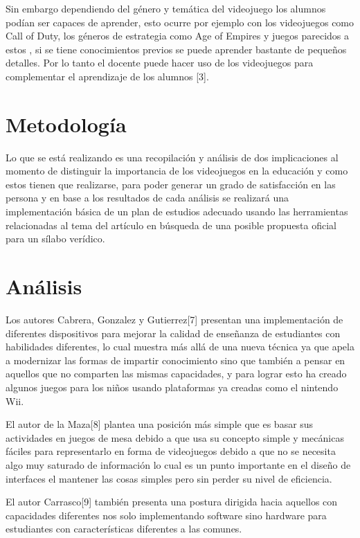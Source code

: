 \documentclass[conference, letterpaper]{IEEEtran}
\begin{document}
Sin embargo dependiendo del género y temática del videojuego los alumnos podían ser capaces de aprender, esto ocurre por ejemplo con los videojuegos como Call of Duty, los géneros de estrategia como Age of Empires y juegos parecidos a estos , si se tiene conocimientos previos se puede aprender bastante de pequeños detalles. Por lo tanto el docente puede hacer uso de los videojuegos para complementar el aprendizaje de los alumnos [3]. 
\section{Metodología}
Lo que se está realizando es una recopilación y análisis de dos implicaciones al momento de distinguir la importancia de los videojuegos en la educación y como estos tienen que realizarse, para poder generar un grado de satisfacción en las persona y en base a los resultados de cada análisis se realizará una implementación básica de un plan de estudios adecuado usando las herramientas relacionadas al tema del artículo en búsqueda de una posible propuesta oficial para un sílabo verídico.
\section{Análisis}
Los autores Cabrera, Gonzalez y Gutierrez[7] presentan una implementación de diferentes dispositivos para mejorar la calidad de enseñanza de estudiantes con habilidades diferentes, lo cual muestra más allá de una nueva técnica ya que apela a modernizar las formas de impartir conocimiento sino que también a pensar en aquellos que no comparten las mismas capacidades, y para lograr esto ha creado algunos juegos para los niños usando plataformas ya creadas como el nintendo Wii.

El autor de la Maza[8] plantea una posición más simple que es basar sus actividades en juegos de mesa debido a que usa su concepto simple y mecánicas fáciles para representarlo en forma de videojuegos debido a que no se necesita algo muy saturado de información lo cual es un punto importante en el diseño de interfaces el mantener las cosas simples pero sin perder su nivel de  eficiencia.

El autor Carrasco[9] también presenta una postura dirigida hacia aquellos con capacidades diferentes nos solo implementando software sino hardware para estudiantes con características diferentes a las comunes.
\end{document}
